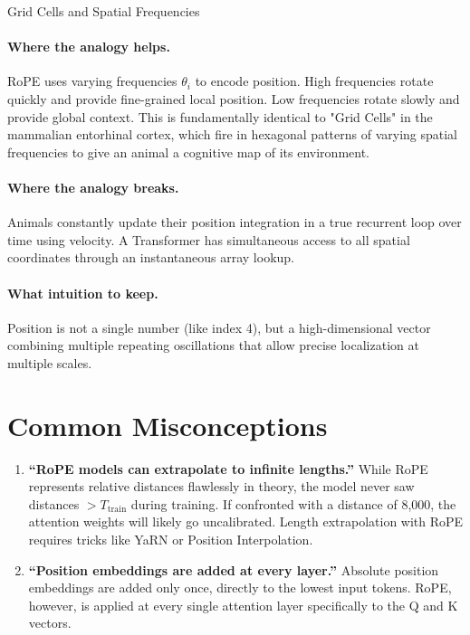 \begin{analogybox}{Grid Cells and Spatial Frequencies}
  \paragraph{Where the analogy helps.}
  RoPE uses varying frequencies $\theta_i$ to encode position. High frequencies rotate quickly and provide fine-grained local position. Low frequencies rotate slowly and provide global context. This is fundamentally identical to "Grid Cells" in the mammalian entorhinal cortex, which fire in hexagonal patterns of varying spatial frequencies to give an animal a cognitive map of its environment. 

  \paragraph{Where the analogy breaks.}
  Animals constantly update their position integration in a true recurrent loop over time using velocity. A Transformer has simultaneous access to all spatial coordinates through an instantaneous array lookup.

  \paragraph{What intuition to keep.}
  Position is not a single number (like index 4), but a high-dimensional vector combining multiple repeating oscillations that allow precise localization at multiple scales.
\end{analogybox}


\section{Common Misconceptions}
\label{ch:11:sec:misconceptions}

\begin{enumerate}
  \item \textbf{``RoPE models can extrapolate to infinite lengths.''} While RoPE represents relative distances flawlessly in theory, the model never saw distances $> T_{\text{train}}$ during training. If confronted with a distance of 8,000, the attention weights will likely go uncalibrated. Length extrapolation with RoPE requires tricks like YaRN or Position Interpolation.
  \item \textbf{``Position embeddings are added at every layer.''} Absolute position embeddings are added only once, directly to the lowest input tokens. RoPE, however, is applied at every single attention layer specifically to the Q and K vectors.
\end{enumerate}


